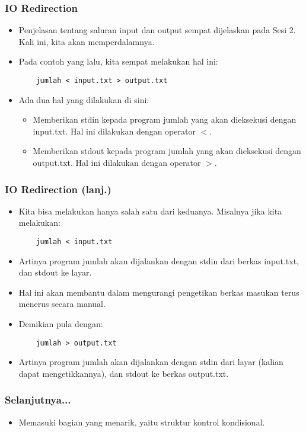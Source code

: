 \documentclass{beamer}
\begin{document}
\begin{frame}[fragile]
\frametitle{IO Redirection}
\begin{itemize}
	\item Penjelasan tentang saluran input dan output sempat dijelaskan pada Sesi 2. Kali ini, kita akan memperdalamnya.
	\item Pada contoh yang lalu, kita sempat melakukan hal ini:
	\begin{lstlisting}
	jumlah < input.txt > output.txt
	\end{lstlisting}
	\item Ada dua hal yang dilakukan di sini:
	\begin{itemize}
		\item Memberikan stdin kepada program jumlah yang akan dieksekusi dengan input.txt. Hal ini dilakukan dengan operator $<$.
		\item Memberikan stdout kepada program jumlah yang akan dieksekusi dengan output.txt. Hal ini dilakukan dengan operator $>$.
	\end{itemize}
\end{itemize}
\end{frame}

\begin{frame}[fragile]
\frametitle{IO Redirection (lanj.)}
\begin{itemize}
	\item Kita bisa melakukan hanya salah satu dari keduanya. Misalnya jika kita melakukan:
	\begin{lstlisting}
	jumlah < input.txt
	\end{lstlisting}
	\item Artinya program jumlah akan dijalankan dengan stdin dari berkas input.txt, dan stdout ke layar.
	\item Hal ini akan membantu dalam mengurangi pengetikan berkas masukan terus menerus secara manual.
	\item Demikian pula dengan:
	\begin{lstlisting}
	jumlah > output.txt
	\end{lstlisting}
	\item Artinya program jumlah akan dijalankan dengan stdin dari layar (kalian dapat mengetikkannya), dan stdout ke berkas output.txt.
	\end{itemize}
\end{frame}

\begin{frame}
\frametitle{Selanjutnya...}
\begin{itemize}
	\item Memasuki bagian yang menarik, yaitu struktur kontrol kondisional.
\end{itemize}
\end{frame}
\end{document}
